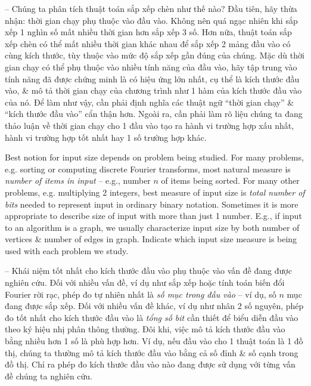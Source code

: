 \documentclass{article}
\begin{document}
\begin{itemize}
\begin{itemize}
\begin{itemize}
            -- Chúng ta phân tích thuật toán sắp xếp chèn như thế nào? Đầu tiên, hãy thừa nhận: thời gian chạy phụ thuộc vào đầu vào. Không nên quá ngạc nhiên khi sắp xếp 1 nghìn số mất nhiều thời gian hơn sắp xếp 3 số. Hơn nữa, thuật toán sắp xếp chèn có thể mất nhiều thời gian khác nhau để sắp xếp 2 mảng đầu vào có cùng kích thước, tùy thuộc vào mức độ sắp xếp gần đúng của chúng. Mặc dù thời gian chạy có thể phụ thuộc vào nhiều tính năng của đầu vào, hãy tập trung vào tính năng đã được chứng minh là có hiệu ứng lớn nhất, cụ thể là kích thước đầu vào, \& mô tả thời gian chạy của chương trình như 1 hàm của kích thước đầu vào của nó. Để làm như vậy, cần phải định nghĩa các thuật ngữ ``thời gian chạy'' \& ``kích thước đầu vào'' cẩn thận hơn. Ngoài ra, cần phải làm rõ liệu chúng ta đang thảo luận về thời gian chạy cho 1 đầu vào tạo ra hành vi trường hợp xấu nhất, hành vi trường hợp tốt nhất hay 1 số trường hợp khác.
            
            Best notion for input size depends on problem being studied. For many problems, e.g. sorting or computing discrete Fourier transforms, most natural measure is {\it number of items in input} -- e.g., number $n$ of items being sorted. For many other problems, e.g. multiplying 2 integers, best measure of input size is {\it total number of bits} needed to represent input in ordinary binary notation. Sometimes it is more appropriate to describe size of input with more than just 1 number. E.g., if input to an algorithm is a graph, we usually characterize input size by both number of vertices \& number of edges in graph. Indicate which input size measure is being used with each problem we study.
            
            -- Khái niệm tốt nhất cho kích thước đầu vào phụ thuộc vào vấn đề đang được nghiên cứu. Đối với nhiều vấn đề, ví dụ như sắp xếp hoặc tính toán biến đổi Fourier rời rạc, phép đo tự nhiên nhất là {\it số mục trong đầu vào} -- ví dụ, số $n$ mục đang được sắp xếp. Đối với nhiều vấn đề khác, ví dụ như nhân 2 số nguyên, phép đo tốt nhất cho kích thước đầu vào là {\it tổng số bit} cần thiết để biểu diễn đầu vào theo ký hiệu nhị phân thông thường. Đôi khi, việc mô tả kích thước đầu vào bằng nhiều hơn 1 số là phù hợp hơn. Ví dụ, nếu đầu vào cho 1 thuật toán là 1 đồ thị, chúng ta thường mô tả kích thước đầu vào bằng cả số đỉnh \& số cạnh trong đồ thị. Chỉ ra phép đo kích thước đầu vào nào đang được sử dụng với từng vấn đề chúng ta nghiên cứu.
            

\end{itemize}
\end{itemize}
\end{itemize}
\end{document}
